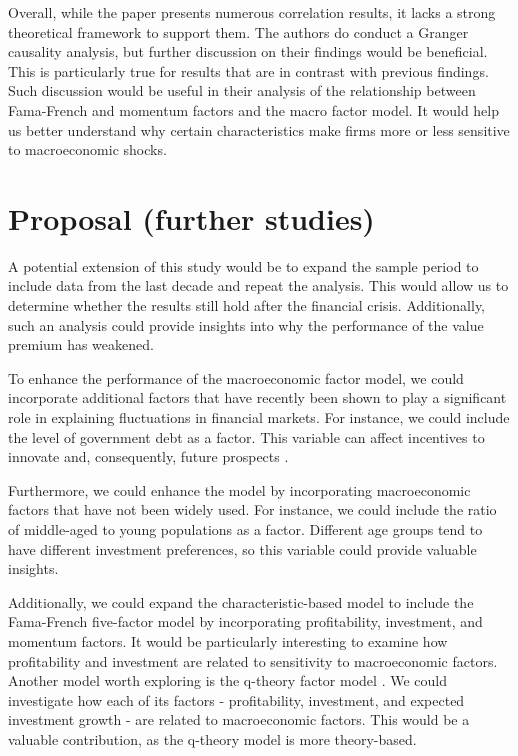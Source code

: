 \documentclass[12pt,a4paper]{ouparticle}
\begin{document}
Overall, while the paper presents numerous correlation results, it lacks a strong theoretical framework to support them. The authors do conduct a Granger causality analysis, but further discussion on their findings would be beneficial. This is particularly true for results that are in contrast with previous findings. Such discussion would be useful in their analysis of the relationship between Fama-French and momentum factors and the macro factor model. It would help us better understand why certain characteristics make firms more or less sensitive to macroeconomic shocks.
 

\section{Proposal (further studies)}
A potential extension of this study would be to expand the sample period to include data from the last decade and repeat the analysis. This would allow us to determine whether the results still hold after the financial crisis. Additionally, such an analysis could provide insights into why the performance of the value premium has weakened.
 
To enhance the performance of the macroeconomic factor model, we could incorporate additional factors that have recently been shown to play a significant role in explaining fluctuations in financial markets. For instance, we could include the level of government debt as a factor. This variable can affect incentives to innovate and, consequently, future prospects \citep{croce2019government}. 

Furthermore, we could enhance the model by incorporating macroeconomic factors that have not been widely used. For instance, we could include the ratio of middle-aged to young populations as a factor. Different age groups tend to have different investment preferences, so this variable could provide valuable insights.

Additionally, we could expand the characteristic-based model to include the Fama-French five-factor model \citep{fama2015five} by incorporating profitability, investment, and momentum factors. It would be particularly interesting to examine how profitability and investment are related to sensitivity to macroeconomic factors. Another model worth exploring is the q-theory factor model \citep{hou2015digesting,hou2021augmented}. We could investigate how each of its factors - profitability, investment, and expected investment growth - are related to macroeconomic factors. This would be a valuable contribution, as the q-theory model is more theory-based. 





\newpage



\end{document}
